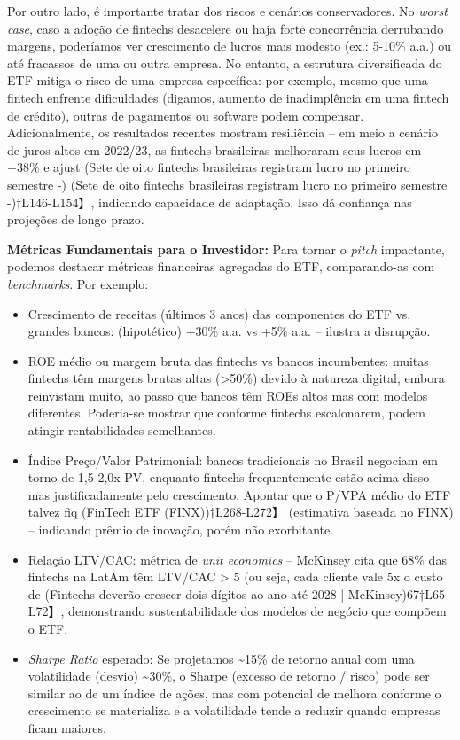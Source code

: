 \documentclass[12pt]{article}
\begin{document}
Por outro lado, é importante tratar dos riscos e cenários conservadores. No \textit{worst case}, caso a adoção de fintechs desacelere ou haja forte concorrência derrubando margens, poderíamos ver crescimento de lucros mais modesto (ex.: 5-10\% a.a.) ou até fracassos de uma ou outra empresa. No entanto, a estrutura diversificada do ETF mitiga o risco de uma empresa específica: por exemplo, mesmo que uma fintech enfrente dificuldades (digamos, aumento de inadimplência em uma fintech de crédito), outras de pagamentos ou software podem compensar. Adicionalmente, os resultados recentes mostram resiliência – em meio a cenário de juros altos em 2022/23, as fintechs brasileiras melhoraram seus lucros em +38\% e ajust (Sete de oito fintechs brasileiras registram lucro no primeiro semestre -) (Sete de oito fintechs brasileiras registram lucro no primeiro semestre -)†L146-L154】, indicando capacidade de adaptação. Isso dá confiança nas projeções de longo prazo.

\textbf{Métricas Fundamentais para o Investidor:} Para tornar o \textit{pitch} impactante, podemos destacar métricas financeiras agregadas do ETF, comparando-as com \textit{benchmarks}. Por exemplo:
\begin{itemize}
\item Crescimento de receitas (últimos 3 anos) das componentes do ETF vs. grandes bancos: (hipotético) +30\% a.a. vs +5\% a.a. – ilustra a disrupção.
\item ROE médio ou margem bruta das fintechs vs bancos incumbentes: muitas fintechs têm margens brutas altas (>50\%) devido à natureza digital, embora reinvistam muito, ao passo que bancos têm ROEs altos mas com modelos diferentes. Poderia-se mostrar que conforme fintechs escalonarem, podem atingir rentabilidades semelhantes.
\item Índice Preço/Valor Patrimonial: bancos tradicionais no Brasil negociam em torno de 1,5-2,0x PV, enquanto fintechs frequentemente estão acima disso mas justificadamente pelo crescimento. Apontar que o P/VPA médio do ETF talvez fiq (FinTech ETF (FINX))†L268-L272】 (estimativa baseada no FINX) – indicando prêmio de inovação, porém não exorbitante.
\item Relação LTV/CAC: métrica de \textit{unit economics} – McKinsey cita que 68\% das fintechs na LatAm têm LTV/CAC > 5 (ou seja, cada cliente vale 5x o custo de (Fintechs deverão crescer dois dígitos ao ano até 2028 | McKinsey)67†L65-L72】, demonstrando sustentabilidade dos modelos de negócio que compõem o ETF.
\item \textit{Sharpe Ratio} esperado: Se projetamos \textasciitilde15\% de retorno anual com uma volatilidade (desvio) \textasciitilde30\%, o Sharpe (excesso de retorno / risco) pode ser similar ao de um índice de ações, mas com potencial de melhora conforme o crescimento se materializa e a volatilidade tende a reduzir quando empresas ficam maiores.
\end{itemize}
\end{document}
